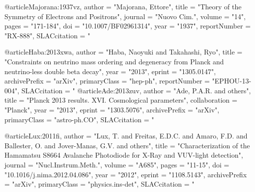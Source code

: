 @article{Majorana:1937vz,
      author         = "Majorana, Ettore",
      title          = "{Theory of the Symmetry of Electrons and Positrons}",
      journal        = "Nuovo Cim.",
      volume         = "14",
      pages          = "171-184",
      doi            = "10.1007/BF02961314",
      year           = "1937",
      reportNumber   = "RX-888",
      SLACcitation   = "%
}

@article{Haba:2013xwa,
      author         = "Haba, Naoyuki and Takahashi, Ryo",
      title          = "{Constraints on neutrino mass ordering and degeneracy
                        from Planck and neutrino-less double beta decay}",
      year           = "2013",
      eprint         = "1305.0147",
      archivePrefix  = "arXiv",
      primaryClass   = "hep-ph",
      reportNumber   = "EPHOU-13-004",
      SLACcitation   = "%
}
@article{Ade:2013zuv,
      author         = "Ade, P.A.R. and others",
      title          = "{Planck 2013 results. XVI. Cosmological parameters}",
      collaboration  = "Planck",
      year           = "2013",
      eprint         = "1303.5076",
      archivePrefix  = "arXiv",
      primaryClass   = "astro-ph.CO",
      SLACcitation   = "%
}

@article{Lux:2011fi,
      author         = "Lux, T. and Freitas, E.D.C. and Amaro, F.D. and
                        Ballester, O. and Jover-Manas, G.V. and others",
      title          = "{Characterization of the Hamamatsu S8664 Avalanche
                        Photodiode for X-Ray and VUV-light detection}",
      journal        = "Nucl.Instrum.Meth.",
      volume         = "A685",
      pages          = "11-15",
      doi            = "10.1016/j.nima.2012.04.086",
      year           = "2012",
      eprint         = "1108.5143",
      archivePrefix  = "arXiv",
      primaryClass   = "physics.ins-det",
      SLACcitation   = "%
}



